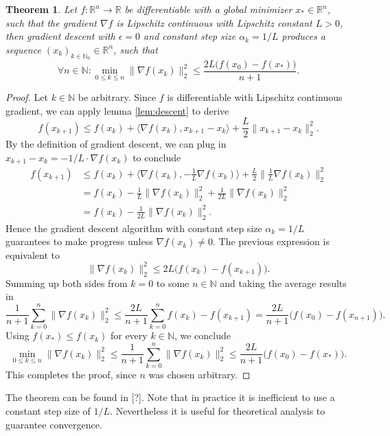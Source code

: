 \documentclass[11pt, a4paper]{article}
\newtheorem{theorem}{Theorem}[section]
\newcommand{\N}{\mathds{N}}
\newcommand{\R}{\mathds{R}}
\begin{document}
\begin{theorem} \label{thm:descent}
Let $f: \R^n \to \R$ be differentiable with a global minimizer $x_* \in \R^n$, such that the gradient $\nabla f$ is Lipschitz continuous with Lipschitz constant $L>0$, then gradient descent with $\epsilon = 0$ and constant step size $\alpha_k = 1/L$ produces a sequence $(x_k)_{k \in \N_0} \in \R^n$, such that 
\[ \forall n \in \N : \min_{0 \leq k \leq n} \big \| \nabla f(x_k) \big \|_2^2 \leq \frac{2L \big ( f(x_0) - f(x_*) \big )}{n+1}. \]
\end{theorem}

\begin{proof}
Let $k \in \N$ be arbitrary. Since $f$ is differentiable with Lipschitz continuous gradient, we can apply lemma \ref{lem:descent} to derive
\[  f(x_{k+1}) \leq f(x_k) + \big \langle \nabla f(x_k) , x_{k+1} -x_k \big \rangle + \frac{L}{2} \big \| x_{k+1} - x_k \big \|_2^2. \]
By the definition of gradient descent, we can plug in $x_{k+1} - x_k = - 1/L \cdot \nabla f(x_k)$ to conclude
\[ \begin{split} 
f(x_{k+1}) 
&\leq f(x_k) + \big \langle \nabla f(x_k) , - \frac{1}{L} \nabla f(x_k) \big \rangle + \frac{L}{2} \big \| \frac{1}{L} \nabla f(x_k) \big \|_2^2 \\\
&= f(x_k) - \frac{1}{L} \big \| \nabla f(x_k) \big \|_2^2 + \frac{1}{2L} \big \| \nabla f(x_k) \big \|_2^2 \\\
&= f(x_k) - \frac{1}{2L} \big \| \nabla f(x_k) \big \|_2^2.
\end{split} \]
Hence the gradient descent algorithm with constant step size $\alpha_k = 1/L$ guarantees to make progress unless $\nabla f(x_k) \neq 0$. The previous expression is equivalent to
\[ \big \| \nabla f(x_k) \big \|_2^2 \leq 2L \big ( f(x_k) - f(x_{k+1}) \big ). \]
Summing up both sides from $k=0$ to some $n \in \N$ and taking the average results in
\[ \frac{1}{n+1} \sum_{k=0}^{n} \big \| \nabla f(x_k) \big \|_2^2 \leq \frac{2L}{n+1} \sum_{k=0}^{n} f(x_k) - f(x_{k+1}) = \frac{2L}{n+1} \big ( f(x_0) - f(x_{n+1}) \big ). \]
Using $f(x_*) \leq f(x_k)$ for every $k \in \N$, we conclude
\[ \min_{0 \leq k \leq n} \big \| \nabla f(x_k) \big \|_2^2 \leq \frac{1}{n+1} \sum_{k=0}^{n} \big \| \nabla f(x_k) \big \|_2^2 \leq \frac{2L}{n+1} \big ( f(x_0) - f(x_*) \big ). \]
This completes the proof, since $n$ was chosen arbitrary.
\end{proof}

The theorem can be found in [?]. Note that in practice it is inefficient to use a constant step size of $1/L$. Nevertheless it is useful for theoretical analysis to guarantee convergence. \\
\end{document}
